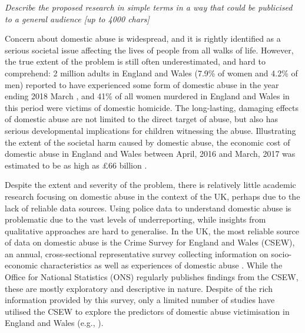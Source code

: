 \documentclass[11pt, a4paper]{article}
\begin{document}
\textit{Describe the proposed research in simple terms in a way that could be publicised to a general audience [up to 4000 chars]}

Concern about domestic abuse is widespread, and it is rightly identified as a serious societal issue affecting the lives of people from all walks of life. However, the true extent of the problem is still often underestimated, and hard to comprehend: 2 million adults in England and Wales (7.9\% of women and 4.2\% of men) reported to have experienced some form of domestic abuse in the year ending 2018 March \cite{ONS}, and 41\% of all women murdered in England and Wales in this period were victims of domestic homicide. The long-lasting, damaging effects of domestic abuse are not limited to the direct target of abuse, but also has serious developmental implications for children witnessing the abuse. Illustrating the extent of the societal harm caused by domestic abuse, the economic cost of domestic abuse in England and Wales between April, 2016 and March, 2017 was estimated to be as high as \pounds 66 billion \cite{costs}.




Despite the extent and severity of the problem, there is relatively little academic research focusing on domestic abuse in the context of the UK, perhaps due to the lack of reliable data sources. Using police data to understand domestic abuse is problematic due to the vast levels of underreporting, while insights from qualitative approaches are hard to generalise. In the UK, the most reliable source of data on domestic abuse is the Crime Survey for England and Wales (CSEW), an annual, cross-sectional representative survey collecting information on socio-economic characteristics as well as experiences of domestic abuse \cite{OfficeforNationalStatistics2019}.  While the Office for National Statistics (ONS) regularly publishes findings from the CSEW, these are mostly exploratory and descriptive in nature. Despite of the rich information provided by this survey, only a limited number of studies have utilised the CSEW to explore the predictors of domestic abuse victimisation in England and Wales (e.g., ). 
\end{document}
